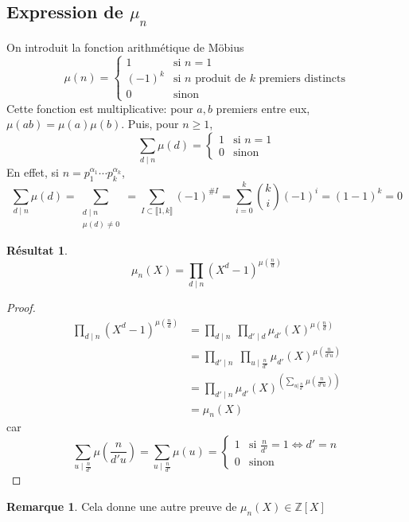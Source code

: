 \documentclass{article}
\theoremstyle{definition}
\newtheorem*{rem}{Remarque}
\newtheorem*{res}{Résultat}
\begin{document}
\subsection{Expression de $\mu_n$}

On introduit la fonction arithmétique de Möbius \[
    \mu(n)=\begin{cases}
        1 &\text{si } n=1 \\
        (-1)^k &\text{si }n\text{ produit de $k$ premiers distincts}\\
        0 &\text{sinon}
    \end{cases}
\]
Cette fonction est multiplicative: pour $a, b$ premiers entre eux, $\mu(ab)=\mu(a)\mu(b)$. Puis, pour $n\geq 1$, \[
    \sum_{d\;|\;n}\mu(d)=\begin{cases}
        1&\text{si }n=1 \\
        0&\text{sinon}
    \end{cases}
\]
En effet, si $n=p_1^{\alpha_1}\cdots p_k^{\alpha_k}$, \[
    \sum_{d\;|\;n}\mu(d)=\sum_{\substack{d\;|\; n\\\mu(d)\neq 0}}=\sum_{I\subset \llbracket 1, k\rrbracket}(-1)^{\#I}=\sum_{i=0}^k\binom ki(-1)^i=(1-1)^k=0
\]

\begin{res}
\[
    \mu_n(X)=\prod_{d\;|\;n}\left(X^d-1\right)^{\mu\left(\frac nd\right)}
\]
\end{res}

\begin{proof}
\begin{align*}
    \prod_{d\;|\; n}\left(X^d-1\right)^{\mu\left(\frac nd\right)}&=\prod_{d\;|\;n}\;\prod_{d'\;|\;d}\mu_{d'}(X)^{\mu\left(\frac nd\right)} \\
    &= \prod_{d'\;|\; n}\;\prod_{u\;|\;\frac n{d'}}\mu_{d'}(X)^{\mu\left(\frac n{d'u}\right)} \\
    &= \prod_{d'\;|\;n}\mu_{d'}(X)^{\left(\displaystyle\sum_{u|\frac n{d'}}\mu\left(\frac n{d'u}\right)\right)}\\
    &=\mu_n(X)
\end{align*}
car \[
\sum_{u\;|\;\frac n{d'}}\mu\left(\frac n{d'u}\right)=\sum_{u\;|\;\frac n{d'}}\mu(u)=\begin{cases}
    1& \text{si }\frac n{d'}=1\iff d'=n \\
    0& \text{sinon}
\end{cases}
\]
\end{proof}

\begin{rem}
Cela donne une autre preuve de $\mu_n(X)\in\mathbb Z[X]$
\end{rem}
\end{document}
